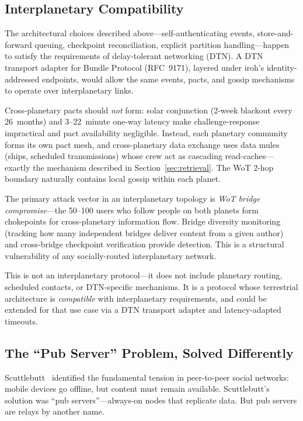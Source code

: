 \documentclass[11pt,a4paper]{article}
\begin{document}
\subsection{Interplanetary Compatibility}

The architectural choices described above---self-authenticating events, store-and-forward queuing, checkpoint reconciliation, explicit partition handling---happen to satisfy the requirements of delay-tolerant networking (DTN). A DTN transport adapter for Bundle Protocol (RFC~9171), layered under iroh's identity-addressed endpoints, would allow the same events, pacts, and gossip mechanisms to operate over interplanetary links.

Cross-planetary pacts should \emph{not} form: solar conjunction (2-week blackout every 26~months) and 3--22~minute one-way latency make challenge-response impractical and pact availability negligible. Instead, each planetary community forms its own pact mesh, and cross-planetary data exchange uses data mules (ships, scheduled transmissions) whose crew act as cascading read-caches---exactly the mechanism described in Section~\ref{sec:retrieval}. The WoT 2-hop boundary naturally contains local gossip within each planet.

The primary attack vector in an interplanetary topology is \emph{WoT bridge compromise}---the 50--100 users who follow people on both planets form chokepoints for cross-planetary information flow. Bridge diversity monitoring (tracking how many independent bridges deliver content from a given author) and cross-bridge checkpoint verification provide detection. This is a structural vulnerability of any socially-routed interplanetary network.

This is not an interplanetary protocol---it does not include planetary routing, scheduled contacts, or DTN-specific mechanisms. It is a protocol whose terrestrial architecture is \emph{compatible} with interplanetary requirements, and could be extended for that use case via a DTN transport adapter and latency-adapted timeouts.

\subsection{The ``Pub Server'' Problem, Solved Differently}

Scuttlebutt~\cite{ssb} identified the fundamental tension in peer-to-peer social networks: mobile devices go offline, but content must remain available. Scuttlebutt's solution was ``pub servers''---always-on nodes that replicate data. But pub servers are relays by another name.
\end{document}
